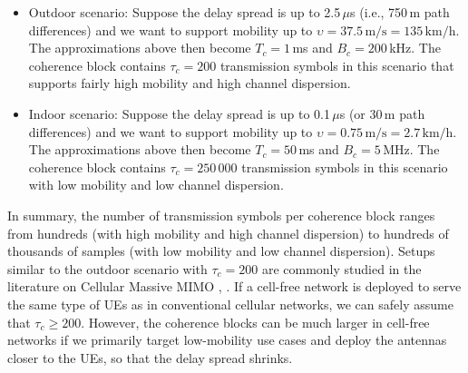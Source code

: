 \begin{itemize}
\item Outdoor scenario: Suppose the delay spread is up to 2.5\,$\mu$s (i.e., 750\,m path differences) and we want to support mobility up to $\upsilon = 37.5 \, \textrm{m/s} = 135 \, \textrm{km/h}$. The approximations above then become  $T_c = 1$\,ms and $B_c = 200$\,kHz. The coherence block contains $\tau_c=200$ transmission symbols in this scenario that supports fairly high mobility and high channel dispersion.

\item Indoor scenario: Suppose the delay spread is up to 0.1\,$\mu$s (or 30\,m path differences) and we want to support mobility up to $\upsilon = 0.75 \, \textrm{m/s} = 2.7 \, \textrm{km/h}$. The approximations above then become $T_c = 50$\,ms and $B_c = 5$\,MHz. The coherence block contains $\tau_c=250\,000$ transmission symbols in this scenario with low mobility and low channel dispersion. 
\end{itemize}

In summary, the number of transmission symbols per coherence block ranges from hundreds (with high mobility and high channel dispersion) to hundreds of thousands of samples (with low mobility and low channel dispersion). Setups similar to the outdoor scenario with  $\tau_c=200$ are commonly studied in the literature on Cellular Massive MIMO \cite{massivemimobook}, \cite{Marzetta2016a}. If a cell-free network is deployed to serve the same type of \glspl{UE} as in conventional cellular networks, we can safely assume that $\tau_c \geq 200$. However, the coherence blocks can be much larger in cell-free networks if we primarily target low-mobility use cases and deploy the antennas closer to the \glspl{UE}, so that the delay spread shrinks.

